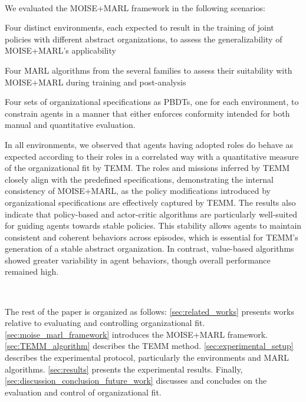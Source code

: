 \documentclass[sigconf,anonymous]{aamas}
\begin{document}
\

We evaluated the MOISE+MARL framework in the following scenarios:
\begin{enumerate*}[label={\roman*) },itemjoin={; \quad}]
  \item Four distinct environments, each expected to result in the training of joint policies with different abstract organizations, to assess the generalizability of MOISE+MARL's applicability
  \item Four MARL algorithms from the several families to assess their suitability with MOISE+MARL during training and post-analysis
  \item Four sets of organizational specifications as PBDTs, one for each environment, to constrain agents in a manner that either enforces conformity intended for both manual and quantitative evaluation.
\end{enumerate*}

In all environments, we observed that agents having adopted roles do behave as expected according to their roles in a correlated way with a quantitative measure of the organizational fit by TEMM. The roles and missions inferred by TEMM closely align with the predefined specifications, demonstrating the internal consistency of MOISE+MARL, as the policy modifications introduced by organizational specifications are effectively captured by TEMM.
The results also indicate that policy-based and actor-critic algorithms are particularly well-suited for guiding agents towards stable policies. This stability allows agents to maintain consistent and coherent behaviors across episodes, which is essential for TEMM's generation of a stable abstract organization. In contrast, value-based algorithms showed greater variability in agent behaviors, though overall performance remained high.

\

\noindent The rest of the paper is organized as follows: \autoref{sec:related_works} presents works relative to evaluating and controlling organizational fit. \autoref{sec:moise_marl_framework} introduces the MOISE+MARL framework. \autoref{sec:TEMM_algorithm} describes the TEMM method. \autoref{sec:experimental_setup} describes the experimental protocol, particularly the environments and MARL algorithms. \autoref{sec:results} presents the experimental results. Finally, \autoref{sec:discussion_conclusion_future_work} discusses and concludes on the evaluation and control of organizational fit.
\end{document}
